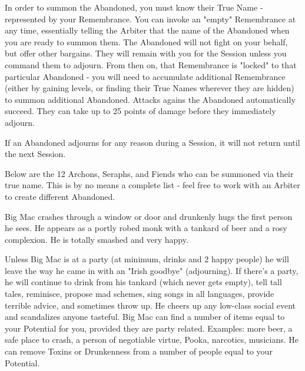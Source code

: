 {




In order to summon the Abandoned, you must know their True Name - represented by your Remembrance.  You can invoke an "empty" Remembrance at any time, essentially telling the Arbiter that the name of the Abandoned when you are ready to summon them.  The Abandoned will not fight on your behalf, but offer other bargains.  They will remain with you for the Session unless you command them to adjourn.  From then on, that Remembrance is "locked" to that particular Abandoned - you will need to accumulate additional Remembrance (either by gaining levels, or finding their True Names wherever they are hidden) to summon additional Abandoned.  Attacks agains the Abandoned automatically succeed.  They can take up to 25 points of damage before they immediately adjourn.

If an Abandoned adjourns for any reason during a Session, it will not return until the next Session.

Below are the 12 Archons, Seraphs, and Fiends who can be summoned via their true name.  This is by no means a complete list - feel free to work with an Arbiter to create different Abandoned. 


\newpage







Big Mac crashes through a window or door and drunkenly hugs the first person he sees. He appears as a portly robed monk with a tankard of beer and a rosy complexion.  He is totally smashed and very happy.  

Unless Big Mac is at a party (at minimum, drinks and 2 happy people) he will leave the way he came in with an "Irish goodbye" (adjourning).  If there's a party, he will continue to drink from his tankard (which never gets empty), tell tall tales, reminisce, propose mad schemes, sing songs in all languages, provide terrible advice, and sometimes throw up.  He cheers up any low-class social event and scandalizes anyone tasteful. Big Mac can find a number of items equal to your Potential for you, provided they are party related.  Examples:  more beer, a safe place to crash, a person of negotiable virtue, Pooka, narcotics, musicians.  He can remove Toxins or Drunkenness from a number of people equal to your Potential.

}
